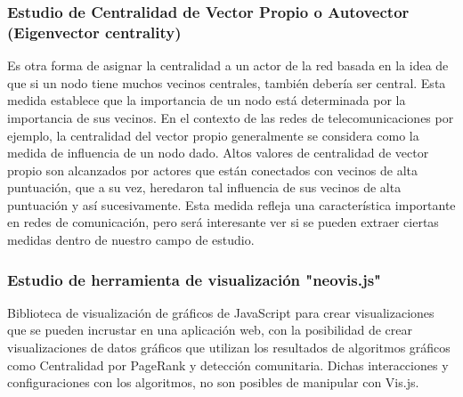 \subsubsection{Estudio de Centralidad de Vector Propio o Autovector (Eigenvector centrality)} Es otra forma de asignar la centralidad a un actor de la red basada en la idea de que si un nodo tiene muchos vecinos centrales, también debería ser central. Esta medida establece que la importancia de un nodo está determinada por la importancia de sus vecinos. En el contexto de las redes de telecomunicaciones por ejemplo, la centralidad del vector propio generalmente se considera como la medida de influencia de un nodo dado. Altos valores de centralidad de vector propio son alcanzados por actores que están conectados con vecinos de alta puntuación, que a su vez, heredaron tal influencia de sus vecinos de alta puntuación y así sucesivamente. Esta medida refleja una característica importante en redes de comunicación, pero será interesante ver si se pueden extraer ciertas medidas dentro de nuestro campo de estudio.

\subsubsection{Estudio de herramienta de visualización "neovis.js"} Biblioteca de visualización de gráficos de JavaScript para crear visualizaciones que se pueden incrustar en una aplicación web, con la posibilidad de crear visualizaciones de datos gráficos que utilizan los resultados de algoritmos gráficos como Centralidad por PageRank y detección comunitaria. Dichas interacciones y configuraciones con los algoritmos, no son posibles de manipular con Vis.js. 